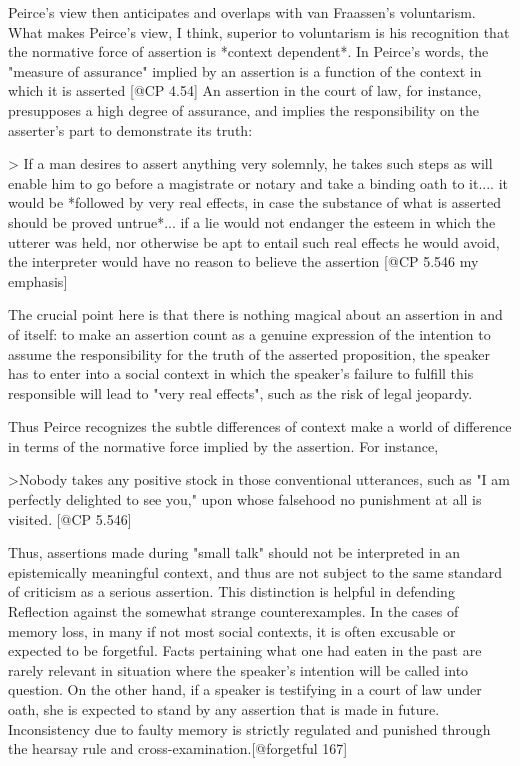 Peirce's view then anticipates and overlaps with van Fraassen's
voluntarism. What makes Peirce's view, I think, superior to voluntarism
is his recognition that the normative force of assertion is *context
dependent*. In Peirce's words, the "measure of assurance" implied by an
assertion is a function of the context in which it is asserted {[}@CP
4.54{]} An assertion in the court of law, for instance, presupposes a
high degree of assurance, and implies the responsibility on the
asserter's part to demonstrate its truth:

\textgreater{} If a man desires to assert anything very solemnly, he
takes such steps as will enable him to go before a magistrate or notary
and take a binding oath to it.... it would be *followed by very real
effects, in case the substance of what is asserted should be proved
untrue*... if a lie would not endanger the esteem in which the utterer
was held, nor otherwise be apt to entail such real effects he would
avoid, the interpreter would have no reason to believe the assertion
{[}@CP 5.546 my emphasis{]}

The crucial point here is that there is nothing magical about an
assertion in and of itself: to make an assertion count as a genuine
expression of the intention to assume the responsibility for the truth
of the asserted proposition, the speaker has to enter into a social
context in which the speaker's failure to fulfill this responsible will
lead to "very real effects", such as the risk of legal jeopardy.

Thus Peirce recognizes the subtle differences of context make a world of
difference in terms of the normative force implied by the assertion. For
instance,

\textgreater{}Nobody takes any positive stock in those conventional
utterances, such as "I am perfectly delighted to see you," upon whose
falsehood no punishment at all is visited. {[}@CP 5.546{]}

Thus, assertions made during "small talk" should not be interpreted in
an epistemically meaningful context, and thus are not subject to the
same standard of criticism as a serious assertion. This distinction is
helpful in defending Reflection against the somewhat strange
counterexamples. In the cases of memory loss, in many if not most social
contexts, it is often excusable or expected to be forgetful. Facts
pertaining what one had eaten in the past are rarely relevant in
situation where the speaker's intention will be called into question. On
the other hand, if a speaker is testifying in a court of law under oath,
she is expected to stand by any assertion that is made in future.
Inconsistency due to faulty memory is strictly regulated and punished
through the hearsay rule and cross-examination.{[}@forgetful 167{]}

